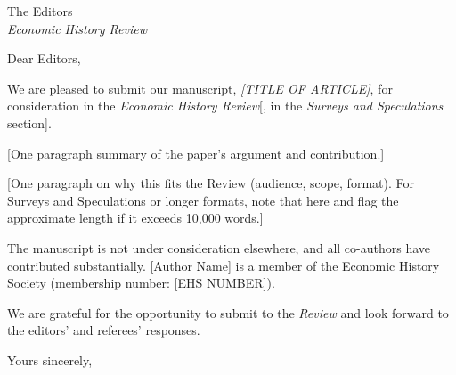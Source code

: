 \documentclass[11pt]{letter}
\date{\today}
\begin{document}
\begin{letter}{The Editors \\ \textit{Economic History Review}}

\opening{Dear Editors,}

We are pleased to submit our manuscript, \textit{[TITLE OF ARTICLE]},
for consideration in the \textit{Economic History Review}[, in the
\textit{Surveys and Speculations} section].

[One paragraph summary of the paper's argument and contribution.]

[One paragraph on why this fits the Review (audience, scope, format).
For Surveys and Speculations or longer formats, note that here and
flag the approximate length if it exceeds 10,000 words.]

The manuscript is not under consideration elsewhere, and all co-authors
have contributed substantially. [Author Name] is a member of the
Economic History Society (membership number: [EHS NUMBER]).

We are grateful for the opportunity to submit to the \textit{Review}
and look forward to the editors' and referees' responses.

\closing{Yours sincerely,}

\end{letter}
\end{document}
